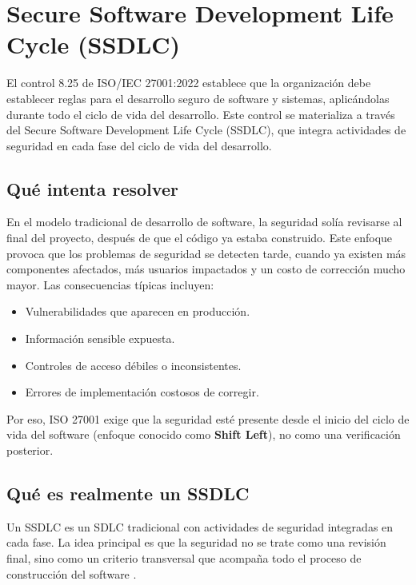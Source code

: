 \section{Secure Software Development Life Cycle (SSDLC)}
\label{sec:ssdlc}

El control 8.25 de ISO/IEC 27001:2022 establece que la organización debe establecer reglas para el desarrollo seguro de software y sistemas, aplicándolas durante todo el ciclo de vida del desarrollo. Este control se materializa a través del Secure Software Development Life Cycle (SSDLC), que integra actividades de seguridad en cada fase del ciclo de vida del desarrollo.

\subsection{Qué intenta resolver}

En el modelo tradicional de desarrollo de software, la seguridad solía revisarse al final del proyecto, después de que el código ya estaba construido. Este enfoque provoca que los problemas de seguridad se detecten tarde, cuando ya existen más componentes afectados, más usuarios impactados y un costo de corrección mucho mayor. Las consecuencias típicas incluyen:

\begin{itemize}
    \item Vulnerabilidades que aparecen en producción.
    \item Información sensible expuesta.
    \item Controles de acceso débiles o inconsistentes.
    \item Errores de implementación costosos de corregir.
\end{itemize}

Por eso, ISO 27001 exige que la seguridad esté presente desde el inicio del ciclo de vida del software (enfoque conocido como \textbf{Shift Left}), no como una verificación posterior.

\subsection{Qué es realmente un SSDLC}

Un SSDLC es un SDLC tradicional con actividades de seguridad integradas en cada fase. La idea principal es que la seguridad no se trate como una revisión final, sino como un criterio transversal que acompaña todo el proceso de construcción del software \cite{nist800218}.

